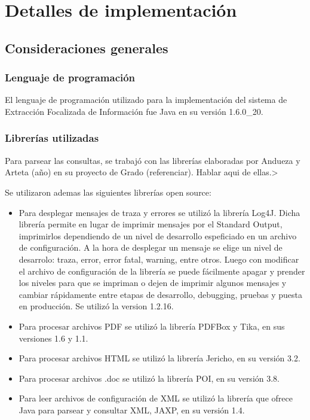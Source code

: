 \chapter{Detalles de implementación} \label{chap:implementacion}

\section{Consideraciones generales} \label{sect:implementacion-consideraciones}

\subsection{Lenguaje de programación} \label{sect:implementacion-lenguaje}

El lenguaje de programación utilizado para la implementación del sistema de Extracción Focalizada de Información fue Java en su versión 1.6.0\_20. \\

\subsection{Librerías utilizadas} \label{sect:implementacion-librerias}

\<Para parsear las consultas, se trabajó con las librerías elaboradas por Andueza y Arteta (año) en su proyecto de Grado (referenciar). Hablar aqui de ellas.>\

Se utilizaron ademas las siguientes librerías open source: 

\begin{itemize}
\item Para desplegar mensajes de traza y errores se utilizó la librería Log4J. Dicha librería permite en lugar de imprimir mensajes por el Standard Output, imprimirlos dependiendo de un nivel de desarrollo espeficiado en un archivo de configuración. A la hora de desplegar un mensaje se elige un nivel de desarrolo: traza, error, error fatal, warning, entre otros. Luego con modificar el archivo de configuración de la librería se puede fácilmente apagar y prender los niveles para que se impriman o dejen de imprimir algunos mensajes y cambiar rápidamente entre etapas de desarrollo, debugging, pruebas y puesta en producción. Se utilizó la version 1.2.16.
\item Para procesar archivos PDF se utilizó la librería PDFBox y Tika, en sus versiones 1.6 y 1.1.
\item Para procesar archivos HTML se utilizó la librería Jericho, en su versión 3.2.
\item Para procesar archivos .doc se utilizó la librería POI, en su versión 3.8.
\item Para leer archivos de configuración de XML se utilizó la librería que ofrece Java para parsear y consultar XML, JAXP, en su versión 1.4.

\end{itemize}

